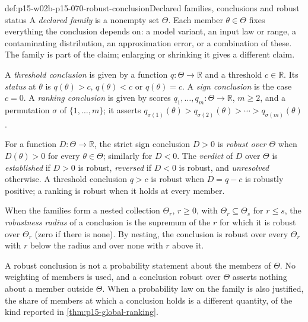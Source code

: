 \begin{hbdefinition}{def:p15-w02b-p15-070-robust-conclusion}{Declared families, conclusions and robust status}
A \emph{declared family} is a nonempty set \(\Theta\). Each member
\(\theta\in\Theta\) fixes everything the conclusion depends on: a model
variant, an input law or range, a contaminating distribution, an
approximation error, or a combination of these. The family is part of
the claim; enlarging or shrinking it gives a different claim.

A \emph{threshold conclusion} is given by a function
\(q:\Theta\to\mathbb R\) and a threshold \(c\in\mathbb R\). Its
\emph{status} at \(\theta\) is \(q(\theta)>c\), \(q(\theta)<c\) or
\(q(\theta)=c\). A \emph{sign conclusion} is the case \(c=0\).
A \emph{ranking conclusion} is given by scores
\(q_1,\ldots,q_m:\Theta\to\mathbb R\), \(m\geq2\), and a permutation
\(\sigma\) of \(\{1,\ldots,m\}\); it asserts
\(q_{\sigma(1)}(\theta)>q_{\sigma(2)}(\theta)>\cdots>q_{\sigma(m)}(\theta)\).

For a function \(D:\Theta\to\mathbb R\), the strict sign conclusion
\(D>0\) is \emph{robust over \(\Theta\)} when \(D(\theta)>0\) for every
\(\theta\in\Theta\); similarly for \(D<0\). The \emph{verdict} of
\(D\) over \(\Theta\) is \emph{established} if \(D>0\) is robust,
\emph{reversed} if \(D<0\) is robust, and \emph{unresolved} otherwise.
A threshold conclusion \(q>c\) is robust when \(D=q-c\) is robustly
positive; a ranking is robust when it holds at every member.

When the families form a nested collection \(\Theta_r\), \(r\geq0\),
with \(\Theta_r\subseteq\Theta_s\) for \(r\leq s\), the
\emph{robustness radius} of a conclusion is the supremum of the \(r\)
for which it is robust over \(\Theta_r\) (zero if there is none).
By nesting, the conclusion is robust over every \(\Theta_r\) with \(r\)
below the radius and over none with \(r\) above it.
\end{hbdefinition}

A robust conclusion is not a probability statement about the members of
\(\Theta\). No weighting of members is used, and a conclusion robust over
\(\Theta\) asserts nothing about a member outside \(\Theta\).
When a probability law on the family is also justified, the share of
members at which a conclusion holds is a different quantity, of the kind
reported in \cref{thm:p15-global-ranking}.

